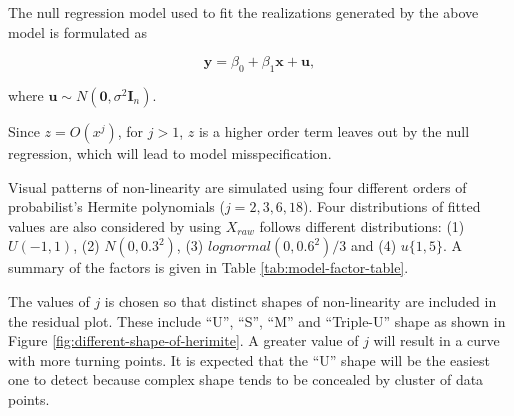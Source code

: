\documentclass[]{interact}
\theoremstyle{plain}%
\theoremstyle{definition}
\theoremstyle{remark}
\begin{document}
The null regression model used to fit the realizations generated by the
above model is formulated as

\begin{equation} \label{eq:null-model}
\boldsymbol{y} = \beta_0 + \beta_1 \boldsymbol{x} + \boldsymbol{u},
\end{equation}

\noindent where
\(\boldsymbol{u} \sim N(\boldsymbol{0}, \sigma^2\boldsymbol{I}_n)\).

Since \(z = O(x^j)\), for \(j > 1\), \(z\) is a higher order term leaves
out by the null regression, which will lead to model misspecification.

Visual patterns of non-linearity are simulated using four different
orders of probabilist's Hermite polynomials (\(j = 2, 3, 6, 18\)). Four
distributions of fitted values are also considered by using \(X_{raw}\)
follows different distributions: (1) \(U(-1, 1)\), (2) \(N(0, 0.3^2)\),
(3) \(lognormal(0, 0.6^2)/3\) and (4) \(u\{1, 5\}\). A summary of the
factors is given in Table \ref{tab:model-factor-table}.

\begin{table}

\caption{\label{tab:model-factor-table}Description of all factors involved in the non-linear and heteroskedasticity studies.}
\centering
{}
\end{table}

The values of \(j\) is chosen so that distinct shapes of non-linearity
are included in the residual plot. These include ``U'', ``S'', ``M'' and
``Triple-U'' shape as shown in Figure
\ref{fig:different-shape-of-herimite}. A greater value of \(j\) will
result in a curve with more turning points. It is expected that the
``U'' shape will be the easiest one to detect because complex shape
tends to be concealed by cluster of data points.
\end{document}
